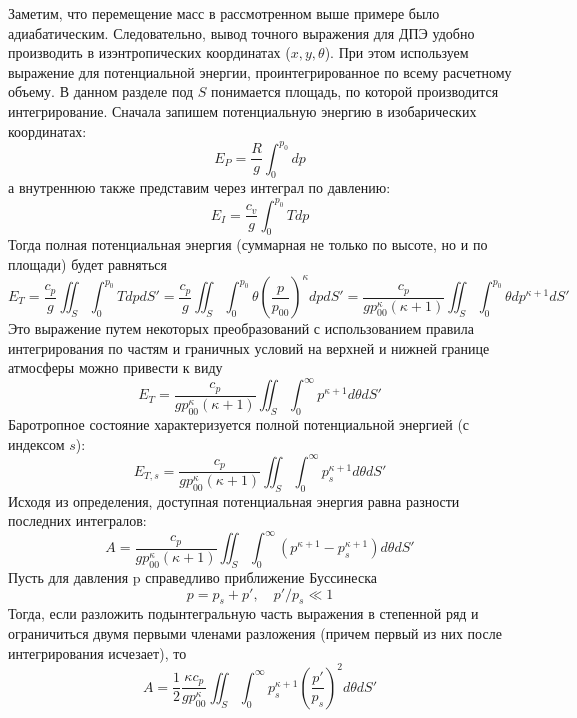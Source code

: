 Заметим, что перемещение масс в рассмотренном выше примере было адиабатическим. Следовательно, вывод точного выражения для ДПЭ удобно производить в изэнтропических координатах ($x,y,\theta$). При этом используем выражение для потенциальной энергии, проинтегрированное по всему расчетному объему. В данном разделе под $S$ понимается площадь, по которой производится интегрирование. Сначала запишем потенциальную энергию в изобарических координатах:
\begin{equation}
E_P=\frac{R}{g}\int_0^{p_0}dp
\end{equation}
а внутреннюю также представим через интеграл по давлению:
\begin{equation}
E_I=\frac{c_v}{g}\int_0^{p_0}Tdp
\end{equation}
Тогда полная потенциальная энергия (суммарная не только по высоте, но и по площади) будет равняться
\begin{equation}
E_T=\frac{c_p}{g}\iint_S\int_0^{p_0}TdpdS' = \frac{c_p}{g}\iint_S\int_0^{p_0}\theta\left(\frac{p}{p_{00}}\right)^\kappa dpdS' = \frac{c_p}{gp_{00}^\kappa (\kappa+1)}\iint_S\int_0^{p_0}\theta dp^{\kappa+1}dS'
\end{equation}
Это выражение путем некоторых преобразований с использованием правила интегрирования по частям и граничных условий на верхней и нижней границе атмосферы можно привести к виду
\begin{equation}
E_T=\frac{c_p}{gp_{00}^\kappa (\kappa+1)}\iint_S\int_0^{\infty}p^{\kappa+1}d\theta dS'
\end{equation}
Баротропное состояние характеризуется полной потенциальной энергией (с индексом $s$):
\begin{equation}
E_{T,s}=\frac{c_p}{gp_{00}^\kappa (\kappa+1)}\iint_S\int_0^{\infty}p_s^{\kappa+1}d\theta dS'
\end{equation}
Исходя из определения, доступная потенциальная энергия равна разности последних интегралов:
\begin{equation}
A=\frac{c_p}{gp_{00}^\kappa (\kappa+1)}\iint_S\int_0^{\infty}\left(p^{\kappa+1} - p_s^{\kappa+1}\right)d\theta dS'
\end{equation}
Пусть для давления p справедливо приближение Буссинеска
\begin{equation}
p=p_s+p', \quad p'/p_s \ll 1
\end{equation}
Тогда, если разложить подынтегральную часть выражения в степенной ряд и ограничиться двумя первыми членами разложения (причем первый из них после интегрирования исчезает), то
\begin{equation}
A=\frac{1}{2}\frac{\kappa c_p}{gp_{00}^\kappa}\iint_S\int_0^{\infty}p_s^{\kappa+1}\left(\frac{p'}{p_s}\right)^2 d\theta dS'
\end{equation}
